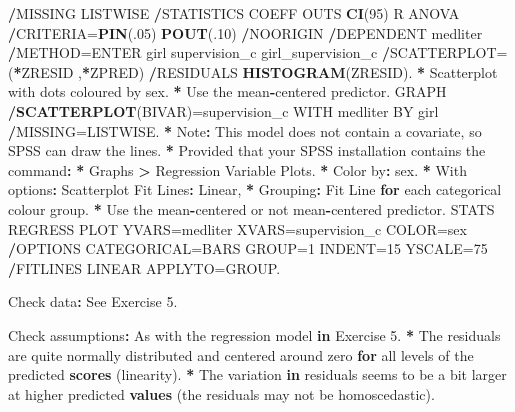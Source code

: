 \documentclass[a4paper]{book}
\newenvironment{Shaded}{\begin{snugshade}}{\end{snugshade}}
\newcommand{\KeywordTok}[1]{\textcolor[rgb]{0,0,0}{\textbf{#1}}}
\newcommand{\DecValTok}[1]{\textcolor[rgb]{0.00,0.00,0.00}{#1}}
\newcommand{\StringTok}[1]{\textcolor[rgb]{0.00,0.00,0.00}{#1}}
\newcommand{\ControlFlowTok}[1]{\textcolor[rgb]{0.00,0.00,0.00}{\textbf{#1}}}
\newcommand{\OperatorTok}[1]{\textcolor[rgb]{0.00,0.00,0.00}{\textbf{#1}}}
\newcommand{\ErrorTok}[1]{\textcolor[rgb]{0.00,0.00,0.00}{\textbf{#1}}}
\newcommand{\NormalTok}[1]{#1}
\theoremstyle{definition}
\theoremstyle{definition}
\theoremstyle{definition}
\theoremstyle{remark}
\begin{document}
\begin{Shaded}
\begin{Highlighting}[]
  \OperatorTok{/}\NormalTok{MISSING LISTWISE  }
  \OperatorTok{/}\NormalTok{STATISTICS COEFF OUTS }\KeywordTok{CI}\NormalTok{(}\DecValTok{95}\NormalTok{) R ANOVA  }
  \OperatorTok{/}\NormalTok{CRITERIA=}\KeywordTok{PIN}\NormalTok{(.}\DecValTok{05}\NormalTok{) }\KeywordTok{POUT}\NormalTok{(.}\DecValTok{10}\NormalTok{)  }
  \OperatorTok{/}\NormalTok{NOORIGIN   }
  \OperatorTok{/}\NormalTok{DEPENDENT medliter  }
  \OperatorTok{/}\NormalTok{METHOD=ENTER girl supervision_c girl_supervision_c  }
  \OperatorTok{/}\NormalTok{SCATTERPLOT=(}\OperatorTok{*}\NormalTok{ZRESID ,}\OperatorTok{*}\NormalTok{ZPRED)  }
  \OperatorTok{/}\NormalTok{RESIDUALS }\KeywordTok{HISTOGRAM}\NormalTok{(ZRESID).  }
\OperatorTok{*}\StringTok{ }\NormalTok{Scatterplot with dots coloured by sex.  }
\OperatorTok{*}\StringTok{ }\NormalTok{Use the mean}\OperatorTok{-}\NormalTok{centered predictor.  }
\NormalTok{GRAPH  }
  \OperatorTok{/}\KeywordTok{SCATTERPLOT}\NormalTok{(BIVAR)=supervision_c WITH medliter BY girl  }
  \OperatorTok{/}\NormalTok{MISSING=LISTWISE.  }
\OperatorTok{*}\StringTok{ }\NormalTok{Note}\OperatorTok{:}\StringTok{ }\NormalTok{This model does not contain a covariate, so SPSS can draw the lines.  }
\OperatorTok{*}\StringTok{ }\NormalTok{Provided that your SPSS installation contains the command}\OperatorTok{:}
\ErrorTok{*}\StringTok{ }\NormalTok{Graphs }\OperatorTok{>}\StringTok{ }\NormalTok{Regression Variable Plots.  }
\OperatorTok{*}\StringTok{ }\NormalTok{Color by}\OperatorTok{:}\StringTok{ }\NormalTok{sex.  }
\OperatorTok{*}\StringTok{ }\NormalTok{With options}\OperatorTok{:}\StringTok{ }\NormalTok{Scatterplot Fit Lines}\OperatorTok{:}\StringTok{ }\NormalTok{Linear,  }
\OperatorTok{*}\StringTok{    }\NormalTok{Grouping}\OperatorTok{:}\StringTok{ }\NormalTok{Fit Line }\ControlFlowTok{for}\NormalTok{ each categorical colour group.  }
\OperatorTok{*}\StringTok{ }\NormalTok{Use the mean}\OperatorTok{-}\NormalTok{centered or not mean}\OperatorTok{-}\NormalTok{centered predictor.  }
\NormalTok{STATS REGRESS PLOT YVARS=medliter XVARS=supervision_c COLOR=sex   }
\OperatorTok{/}\NormalTok{OPTIONS CATEGORICAL=BARS GROUP=}\DecValTok{1}\NormalTok{ INDENT=}\DecValTok{15}\NormalTok{ YSCALE=}\DecValTok{75}   
\OperatorTok{/}\NormalTok{FITLINES LINEAR APPLYTO=GROUP.  }
  
\NormalTok{Check data}\OperatorTok{:}\StringTok{ }\NormalTok{See Exercise }\DecValTok{5}\NormalTok{.  }
  
\NormalTok{Check assumptions}\OperatorTok{:}\StringTok{  }
\StringTok{  }
\NormalTok{As with the regression model }\ControlFlowTok{in}\NormalTok{ Exercise }\DecValTok{5}\NormalTok{.  }
\OperatorTok{*}\StringTok{ }\NormalTok{The residuals are quite normally distributed and centered around zero }\ControlFlowTok{for}
\NormalTok{all levels of the predicted }\KeywordTok{scores}\NormalTok{ (linearity).}
\OperatorTok{*}\StringTok{ }\NormalTok{The variation }\ControlFlowTok{in}\NormalTok{ residuals seems to be a bit larger at higher predicted}
\KeywordTok{values}\NormalTok{ (the residuals may not be homoscedastic).}
  

\end{Highlighting}
\end{Shaded}
\end{document}
